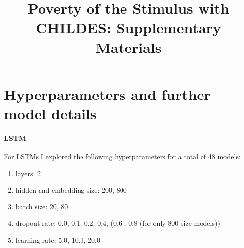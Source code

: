 \documentclass{article}
\title{Poverty of the Stimulus with CHILDES: Supplementary Materials}
\date{}
\begin{document}
\maketitle

\section{Hyperparameters and further model details}
\paragraph{LSTM} For LSTMs I explored the following hyperparameters for a total of 48 models:

\begin{enumerate}
    \item layers: 2
    \item hidden and embedding size: 200, 800
    \item batch size: 20, 80 
    \item dropout rate: 0.0, 0.1, 0.2, 0.4, (0.6 , 0.8 (for only 800 size models))
    \item learning rate: 5.0, 10.0, 20.0
\end{enumerate}
\end{document}
